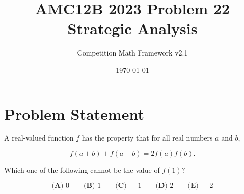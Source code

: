 \documentclass[12pt]{article}
\begin{document}
\title{AMC12B 2023 Problem 22\\Strategic Analysis}
\author{Competition Math Framework v2.1}
\date{\today}
\maketitle

\section*{Problem Statement}

A real-valued function $f$ has the property that for all real numbers $a$ and $b,$

$$f(a + b) + f(a - b) = 2f(a) f(b).$$

Which one of the following cannot be the value of $f(1)?$

$$\textbf{(A) } 0 \qquad \textbf{(B) } 1 \qquad \textbf{(C) } -1 \qquad \textbf{(D) } 2 \qquad \textbf{(E) } -2$$
\end{document}
